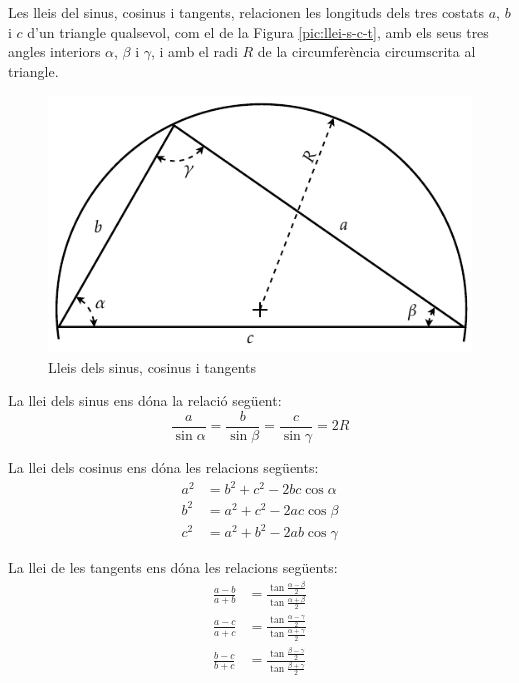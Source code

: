 Les lleis del sinus, cosinus i tangents, relacionen les longituds
dels tres costats $a$, $b$ i $c$ d'un triangle qualsevol, com el de
la Figura \vref{pic:llei-s-c-t}, amb els seus tres angles interiors
$\alpha$, $\beta$ i $\gamma$, i amb el radi $R$ de la circumfer\`{e}ncia circumscrita al triangle.

\begin{figure}[htb]
\centering
    \includegraphics{Imatges/Ape-Trigonometria-Triangle.pdf}
\caption{Lleis dels sinus, cosinus i tangents} \label{pic:llei-s-c-t}
\end{figure}

La llei dels sinus ens d\'{o}na la relaci\'{o} seg\"{u}ent:
\begin{equation}
    \frac{a}{\sin\alpha} = \frac{b}{\sin\beta} =
    \frac{c}{\sin\gamma} = 2 R
\end{equation}

La llei dels cosinus ens d\'{o}na les relacions seg\"{u}ents:
\begin{subequations}
\begin{align}
    a^2 &= b^2 + c^2 - 2 b c \cos\alpha \\[1ex]
    b^2 &= a^2 + c^2 - 2 a c \cos\beta \\[1ex]
    c^2 &= a^2 + b^2 - 2 a b \cos\gamma
\end{align}
\end{subequations}

La llei de les tangents ens d\'{o}na les relacions seg\"{u}ents:
\begin{subequations}
\begin{align}
    \frac{a-b}{a+b} &= \frac{\tan\frac{\alpha-\beta}{2}}{\tan\frac{\alpha+\beta}{2}} \\[1ex]
    \frac{a-c}{a+c} &= \frac{\tan\frac{\alpha-\gamma}{2}}{\tan\frac{\alpha+\gamma}{2}} \\[1ex]
    \frac{b-c}{b+c} &= \frac{\tan\frac{\beta-\gamma}{2}}{\tan\frac{\beta+\gamma}{2}}
\end{align}
\end{subequations}

